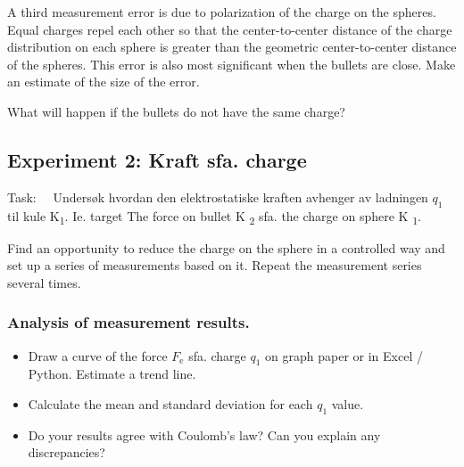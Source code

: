 \documentclass[../Elmag-labhefte-2022.tex]{subfiles}
\begin{document}
\begin{itemize}
A third measurement error is due to polarization of the charge on the spheres. Equal charges repel each other so that the center-to-center distance of the charge distribution on each sphere is greater than the geometric center-to-center distance of the spheres. This error is also most significant when the bullets are close. Make an estimate of the size of the error.

What will happen if the bullets do not have the same charge?



\subsection{Experiment 2: Kraft sfa. charge}

Task: \ \
{\itsf Undersøk hvordan den elektrostatiske kraften avhenger av ladningen $q_1$ til kule K\textsubscript{1}. Ie. target The force on bullet K \textsubscript{2} sfa. the charge on sphere K \textsubscript{1}.}

Find an opportunity to reduce the charge on the sphere in a controlled way and set up a series of measurements based on it. Repeat the measurement series several times.

\subsubsection{Analysis of measurement results.}

\vspace{-4mm}
\begin{itemize}
    \item Draw a curve of the force $F_\text{e}$ sfa. charge $q_1$ on graph paper or in Excel / Python. Estimate a trend line.
    \item Calculate the mean and standard deviation for each $q_1$ value.
    \item Do your results agree with Coulomb's law? Can you explain any discrepancies?
\end{itemize}



\end{itemize}
\end{document}
